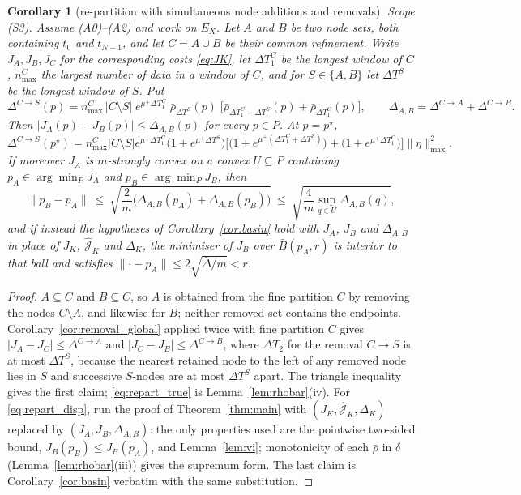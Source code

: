 \documentclass[11pt]{article}
\newtheorem{corollary}{Corollary}
\theoremstyle{remark}\newtheorem{remark}{Remark}
\newcommand{\pstar}{p^\star}
\newcommand{\norm}[1]{\lVert #1\rVert}
\newcommand{\hatJ}{\hat{\mathcal J}}
\begin{document}
\begin{corollary}[re-partition with simultaneous node additions and removals]\label{cor:repartition}
\emph{Scope (S3).} Assume (A0)--(A2) and work on $E_X$. Let $A$ and $B$ be two node sets, both containing $t_0$ and $t_{N-1}$, and let $C=A\cup B$ be their common refinement. Write $J_A,J_B,J_C$ for the corresponding costs \eqref{eq:JK}, let $\Delta T_1^{C}$ be the longest window of $C$, $n^{C}_{\max}$ the largest number of data in a window of $C$, and for $S\in\{A,B\}$ let $\Delta T^{S}$ be the longest window of $S$. Put
\begin{equation}
\Delta^{C\to S}(p)=n^{C}_{\max}\,\big|C\setminus S\big|\;
e^{\mu^{+}\Delta T_1^{C}}\;\bar\rho_{\Delta T^{S}}(p)\;
\Big[\bar\rho_{\Delta T_1^{C}+\Delta T^{S}}(p)+\bar\rho_{\Delta T_1^{C}}(p)\Big],
\qquad
\Delta_{A,B}=\Delta^{C\to A}+\Delta^{C\to B}.
\label{eq:repart}
\end{equation}
Then $\big|J_A(p)-J_B(p)\big|\le\Delta_{A,B}(p)$ for every $p\in P$. At $p=\pstar$,
\begin{equation}
\Delta^{C\to S}(\pstar)=n^{C}_{\max}\big|C\setminus S\big|e^{\mu^{+}\Delta T_1^{C}}
\big(1+e^{\mu^{+}\Delta T^{S}}\big)
\Big[\big(1+e^{\mu^{+}(\Delta T_1^{C}+\Delta T^{S})}\big)+\big(1+e^{\mu^{+}\Delta T_1^{C}}\big)\Big]\norm\eta_{\max}^{2}.
\label{eq:repart_true}
\end{equation}
If moreover $J_A$ is $m$-strongly convex on a convex $U\subseteq P$ containing $p_A\in\arg\min_{P}J_A$ and $p_B\in\arg\min_{P}J_B$, then
\begin{equation}
\norm{p_B-p_A}\ \le\ \sqrt{\frac2m\Big(\Delta_{A,B}(p_A)+\Delta_{A,B}(p_B)\Big)}
\ \le\ \sqrt{\frac4m\sup_{q\in U}\Delta_{A,B}(q)} ,
\label{eq:repart_disp}
\end{equation}
and if instead the hypotheses of Corollary~\ref{cor:basin} hold with $J_A$, $J_B$ and $\Delta_{A,B}$ in place of $J_K$, $\hatJ_K$ and $\Delta_K$, the minimiser of $J_B$ over $\bar B(p_A,r)$ is interior to that ball and satisfies $\norm{\cdot-p_A}\le2\sqrt{\bar\Delta/m}<r$.
\end{corollary}
\begin{proof}
$A\subseteq C$ and $B\subseteq C$, so $A$ is obtained from the fine partition $C$ by removing the nodes $C\setminus A$, and likewise for $B$; neither removed set contains the endpoints. Corollary~\ref{cor:removal_global} applied twice with fine partition $C$ gives $|J_A-J_C|\le\Delta^{C\to A}$ and $|J_C-J_B|\le\Delta^{C\to B}$, where $\Delta T_2$ for the removal $C\to S$ is at most $\Delta T^{S}$, because the nearest retained node to the left of any removed node lies in $S$ and successive $S$-nodes are at most $\Delta T^{S}$ apart. The triangle inequality gives the first claim; \eqref{eq:repart_true} is Lemma~\ref{lem:rhobar}(iv). For \eqref{eq:repart_disp}, run the proof of Theorem~\ref{thm:main} with $(J_K,\hatJ_K,\Delta_K)$ replaced by $(J_A,J_B,\Delta_{A,B})$: the only properties used are the pointwise two-sided bound, $J_B(p_B)\le J_B(p_A)$, and Lemma~\ref{lem:vi}; monotonicity of each $\bar\rho$ in $\delta$ (Lemma~\ref{lem:rhobar}(iii)) gives the supremum form. The last claim is Corollary~\ref{cor:basin} verbatim with the same substitution.
\end{proof}
\end{document}
